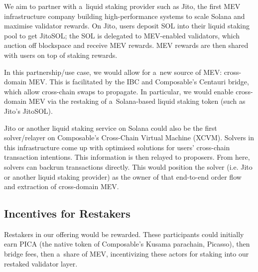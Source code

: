 \documentclass[sigplan,screen,authorversion]{acmart}
\begin{document}
We aim to partner with a~liquid staking provider such as Jito, the
first MEV infrastructure company building high-performance systems to
scale Solana and maximise validator rewards. On Jito, users deposit
SOL into their liquid staking pool to get JitoSOL; the SOL is
delegated to MEV-enabled validators, which auction off blockspace and
receive MEV rewards. MEV rewards are then shared with users on top of
staking rewards.

In this partnership/use case, we would allow for a~new source of MEV:
cross-domain MEV. This is facilitated by the IBC and Composable’s
Centauri bridge, which allow cross-chain swaps to propagate. In
particular, we would enable cross-domain MEV via the restaking of
a~Solana-based liquid staking token (such as Jito’s JitoSOL).

Jito or another liquid staking service on Solana could also be the
first solver/relayer on Composable’s Cross-Chain Virtual Machine
(XCVM). Solvers in this infrastructure come up with optimised
solutions for users’ cross-chain transaction intentions. This
information is then relayed to proposers. From here, solvers can
backrun transactions directly. This would position the solver
(i.e. Jito or another liquid staking provider) as the owner of that
end-to-end order flow and extraction of cross-domain MEV.

\subsection{Incentives for Restakers}

Restakers in our offering would be rewarded. These participants could
initially earn PICA (the native token of Composable’s Kusama
parachain, Picasso), then bridge fees, then a~share of MEV,
incentivizing these actors for staking into our restaked validator
layer.
\end{document}
